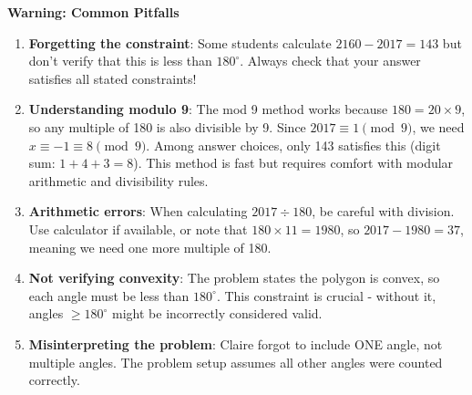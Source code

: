 \documentclass[]{article}
\begin{document}
\begin{warningbox}
\textbf{Warning: Common Pitfalls}

\begin{enumerate}[leftmargin=*]
    \item \textbf{Forgetting the constraint}: Some students calculate $2160 - 2017 = 143$ but don't verify that this is less than $180^\circ$. Always check that your answer satisfies all stated constraints!
    
    \item \textbf{Understanding modulo 9}: The mod 9 method works because $180 = 20 \times 9$, so any multiple of 180 is also divisible by 9. Since $2017 \equiv 1 \pmod{9}$, we need $x \equiv -1 \equiv 8 \pmod{9}$. Among answer choices, only 143 satisfies this (digit sum: $1+4+3=8$). This method is fast but requires comfort with modular arithmetic and divisibility rules.
    
    \item \textbf{Arithmetic errors}: When calculating $2017 \div 180$, be careful with division. Use calculator if available, or note that $180 \times 11 = 1980$, so $2017 - 1980 = 37$, meaning we need one more multiple of 180.
    
    \item \textbf{Not verifying convexity}: The problem states the polygon is convex, so each angle must be less than $180^\circ$. This constraint is crucial - without it, angles $\geq 180^\circ$ might be incorrectly considered valid.
    
    \item \textbf{Misinterpreting the problem}: Claire forgot to include ONE angle, not multiple angles. The problem setup assumes all other angles were counted correctly.
\end{enumerate}
\end{warningbox}
\end{document}
